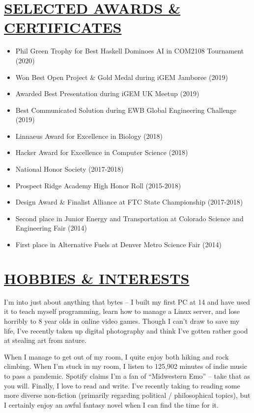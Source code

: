 \documentclass[twocolumn, a4paper, fontsize=9pt, headsepline, footsepline]{scrartcl}
\begin{document}
\section*{\ul{SELECTED AWARDS \& CERTIFICATES}}
\begin{itemize}
\item Phil Green Trophy for Best Haskell Dominoes AI in COM2108 Tournament (2020)
\item Won Best Open Project \& Gold Medal during iGEM Jamboree (2019)
\item Awarded Best Presentation during iGEM UK Meetup (2019)
\item Best Communicated Solution during EWB Global Engineering Challenge (2019)
\item Linnaeus Award for Excellence in Biology (2018)
\item Hacker Award for Excellence in Computer Science (2018)
\item National Honor Society (2017-2018)
\item Prospect Ridge Academy High Honor Roll (2015-2018)
\item Design Award \& Finalist Alliance at FTC State Championship (2017-2018)
\item Second place in Junior Energy and Transportation at Colorado Science and
  Engineering Fair (2014)
\item First place in Alternative Fuels at Denver Metro Science Fair (2014)
\end{itemize}
\section*{\ul{HOBBIES \& INTERESTS}}
\noindent

I'm into just about anything that bytes – I built my first PC at 14 and have
used it to teach myself programming, learn how to manage a Linux server, and
lose horribly to 8 year olds in online video games. Though I can't draw to save
my life, I've recently taken up digital photography and think I've gotten rather
good at stealing art from nature.

When I manage to get out of my room, I quite enjoy both hiking and rock
climbing. When I'm stuck in my room, I listen to 125,902 minutes of indie music
to pass a pandemic. Spotify claims I'm a fan of ``Midwestern Emo'' – take that
as you will. Finally, I love to read and write. I've recently taking to reading
some more diverse non-fiction (primarily regarding political / philosophical
topics), but I certainly enjoy an awful fantasy novel when I can find the time
for it.
\end{document}
